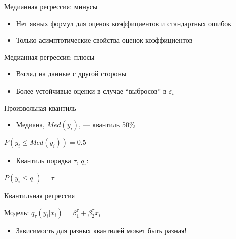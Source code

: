 \documentclass[ignorenonframetext,]{beamer}
\newcommand{\e}{\varepsilon}
\begin{document}
\begin{frame}{Медианная регрессия: минусы}

\begin{itemize}
\item
  Нет явных формул для оценок коэффициентов и стандартных ошибок
\item
  Только асимптотические свойства оценок коэффициентов
\end{itemize}

\end{frame}

\begin{frame}{Медианная регрессия: плюсы}

\begin{itemize}
\item
  Взгляд на данные с другой стороны
\item
  Более устойчивые оценки в случае ``выбросов'' в \(\e_i\)
\end{itemize}

\end{frame}

\begin{frame}{Произвольная квантиль}

\begin{itemize}
\itemsep1pt\parskip0pt
\item
  Медиана, \(Med(y_i)\), --- квантиль 50\%
\end{itemize}

\(P(y_i \leq Med(y_i))=0.5\)

\begin{itemize}
\itemsep1pt\parskip0pt
\item
  Квантиль порядка \(\tau\), \(q_{\tau}\):
\end{itemize}

\(P(y_i \leq q_{\tau})=\tau\)

\end{frame}

\begin{frame}{Квантильная регрессия}

Модель: \(q_{\tau}(y_i|x_i)=\beta_1^{\tau} + \beta_2^{\tau} x_i\)

\begin{itemize}
\itemsep1pt\parskip0pt
\item
  Зависимость для разных квантилей может быть разная!
\end{itemize}

\end{frame}
\end{document}
